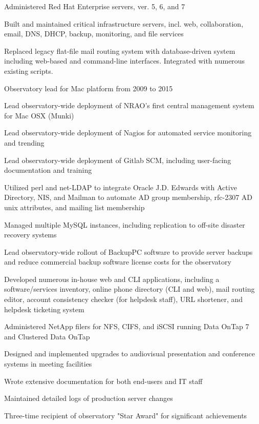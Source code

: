 \documentclass[letterpaper]{deedy-resume}
\begin{document}
\begin{minipage}[t]{0.69\textwidth}
\begin{tightitemize}
	\item Administered Red Hat Enterprise servers, ver. 5, 6, and 7
	\item Built and maintained critical infrastructure servers, incl. web, collaboration, email, DNS, DHCP, backup, monitoring, and file services
	\item Replaced legacy flat-file mail routing system with database-driven system including web-based and command-line interfaces. Integrated with numerous existing scripts.
	\item Observatory lead for Mac platform from 2009 to 2015
	\item Lead observatory-wide deployment of NRAO's first central management system for Mac OSX (Munki)
	\item Lead observatory-wide deployment of Nagios for automated service monitoring and trending
	\item Lead observatory-wide deployment of Gitlab SCM, including user-facing	documentation and training
	\item Utilized perl and net-LDAP to integrate Oracle J.D. Edwards with Active Directory, NIS, and Mailman to automate AD group membership, rfc-2307 AD unix attributes, and mailing list membership
	\item Managed multiple MySQL instances, including replication to off-site disaster recovery systems
	\item Lead observatory-wide rollout of BackupPC software to provide  server backups and reduce commercial backup software license costs for the observatory
	\item Developed numerous in-house web and CLI applications, including a software/services inventory, online phone directory (CLI and web), mail routing editor, account consistency checker (for helpdesk staff), URL shortener, and helpdesk ticketing system
	\item Administered NetApp filers for NFS, CIFS, and iSCSI running Data OnTap 7 and Clustered Data OnTap
	\item Designed and implemented upgrades to audiovisual presentation and conference systems in meeting facilities
	\item Wrote extensive documentation for both end-users and IT staff
	\item Maintained detailed logs of production server changes
	\item Three-time recipient of observatory "Star Award" for significant achievements
\end{tightitemize}


\end{minipage}
\end{document}
